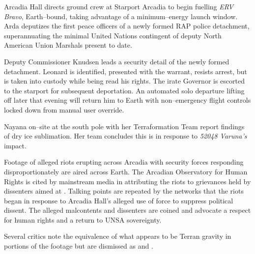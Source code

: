 Arcadia Hall directs ground crew at Starport Arcadia to begin fuelling {\it ERV Bravo}, Earth--bound, taking advantage of a minimum--energy launch window. Arda deputizes the first peace officers of a newly formed RAP police detachment, superannuating the minimal United Nations contingent of deputy North American Union Marshals present to date.

Deputy Commissioner Knudsen leads a security detail of the newly formed detachment. Leonard is identified, presented with the warrant, resists arrest, but is taken into custody while being read his rights. The irate Governor is escorted to the starport for subsequent deportation. An automated solo departure lifting off later that evening will return him to Earth with non--emergency flight controls locked down from manual user override.
\StopTimelineDate

Nayana on--site at the south pole with her Terraformation Team report findings of dry ice sublimation. Her team concludes this is in response to {\it 52048 Varuna's} impact.
\StopTimelineDate

Footage of alleged riots erupting across Arcadia with security forces responding disproportionately are aired across Earth. The Arcadian Observatory for Human Rights is cited by mainstream media in attributing the riots to grievances held by dissenters aimed at . Talking points are repeated by the networks that the riots began in response to Arcadia Hall's alleged use of force to suppress political dissent. The alleged malcontents and dissenters are coined  and advocate a respect for human rights and a return to UNSA sovereignty.

Several critics note the equivalence of what appears to be Terran gravity in portions of the footage but are dismissed as  and .
\StopTimelineDate

